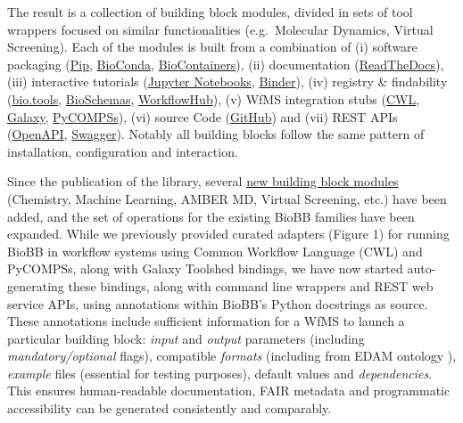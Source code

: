 The result is a collection of building block modules, divided in sets of
tool wrappers focused on similar functionalities (e.g.~Molecular
Dynamics, Virtual Screening). Each of the modules is built from a
combination of (i) software packaging
(\href{https://pypi.org/project/biobb/}{Pip},
\href{https://bioconda.github.io/search.html?q=biobb}{BioConda},
\href{https://biocontainers.pro/}{BioContainers}), (ii) documentation
(\href{https://biobb.readthedocs.io/}{ReadTheDocs}), (iii) interactive
tutorials
(\href{http://mmb.irbbarcelona.org/biobb/workflows/tutorials/md_setup}{Jupyter
Notebooks},
\href{https://bioexcel-binder.tsi.ebi.ac.uk/v2/gh/bioexcel/biobb_wf_md_setup/master?filepath=biobb_wf_md_setup\%2Fnotebooks\%2Fbiobb_MDsetup_tutorial.ipynb}{Binder}),
(iv) registry \& findability (\href{https://bio.tools/biobb}{bio.tools},
\href{https://bioschemas.org/profiles/ComputationalTool/0.5-DRAFT/}{BioSchemas},
\href{https://workflowhub.eu/programmes/2}{WorkflowHub}), (v) WfMS
integration stubs
(\href{https://github.com/bioexcel/biobb_adapters/tree/v0.1.4/biobb_adapters/cwl}{CWL},
\href{https://toolshed.g2.bx.psu.edu/repository?repository_id=e23296b413014cfc}{Galaxy},
\href{https://github.com/bioexcel/biobb_adapters/tree/v0.1.4/biobb_adapters/pycompss}{PyCOMPSs}),
(vi) source Code (\href{https://github.com/bioexcel/biobb}{GitHub}) and
(vii) REST APIs
(\href{https://mmb.irbbarcelona.org/biobb-api/rest}{OpenAPI},
\href{https://mmb.irbbarcelona.org/biobb-api/rest/swagger.json}{Swagger}).
Notably all building blocks follow the same pattern of installation,
configuration and interaction.

Since the publication of the library, several
\href{https://mmb.irbbarcelona.org/biobb/documentation/source}{new
building block modules} (Chemistry, Machine Learning, AMBER MD, Virtual
Screening, etc.) have been added, and the set of operations for the
existing BioBB families have been expanded. While we previously provided
curated adapters (Figure 1) for running BioBB in workflow systems using
Common Workflow Language (CWL) and PyCOMPSs, along with Galaxy Toolshed
bindings, we have now started auto-generating these bindings, along with
command line wrappers and REST web service APIs, using annotations
within BioBB's Python docstrings as source. These annotations include
sufficient information for a WfMS to launch a particular building block:
\emph{input} and \emph{output} parameters (including
\emph{mandatory/optional} flags), compatible \emph{formats} (including
from EDAM ontology \cite{ch6-11}), \emph{example} files (essential for
testing purposes), default values and \emph{dependencies}. This ensures
human-readable documentation, FAIR metadata and programmatic
accessibility can be generated consistently and comparably.

